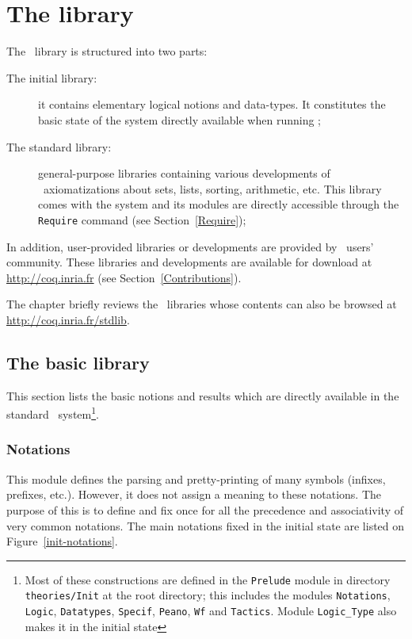 \chapter[The {\Coq} library]{The {\Coq} library\label{Theories}}

The \Coq\ library is structured into two parts:

\begin{description}
\item[The initial library:] it contains
  elementary logical notions and data-types. It constitutes the
  basic state of the system directly available when running
  \Coq;

\item[The standard library:] general-purpose libraries containing
  various developments of \Coq\ axiomatizations about sets, lists,
  sorting, arithmetic, etc. This library comes with the system and its
  modules are directly accessible through the \verb!Require! command
  (see Section~\ref{Require});
\end{description}

In addition, user-provided libraries or developments are provided by
\Coq\ users' community. These libraries and developments are available
for download at \url{http://coq.inria.fr} (see
Section~\ref{Contributions}).

The chapter briefly reviews the \Coq\ libraries whose contents can
also be browsed at \url{http://coq.inria.fr/stdlib}.

\section[The basic library]{The basic library\label{Prelude}}

This section lists the basic notions and results which are directly
available in the standard \Coq\ system\footnote{Most 
of these constructions are defined in the
{\tt Prelude} module in directory {\tt theories/Init} at the {\Coq}
root directory; this includes the modules
{\tt Notations},
{\tt Logic},
{\tt Datatypes},
{\tt Specif},
{\tt Peano},
{\tt Wf} and 
{\tt Tactics}.
Module {\tt Logic\_Type} also makes it in the initial state}.

\subsection[Notations]{Notations\label{Notations}}

This module defines the parsing and pretty-printing of many symbols
(infixes, prefixes, etc.). However, it does not assign a meaning to
these notations. The purpose of this is to define and fix once for all
the precedence and associativity of very common notations. The main
notations fixed in the initial state are listed on
Figure~\ref{init-notations}.

